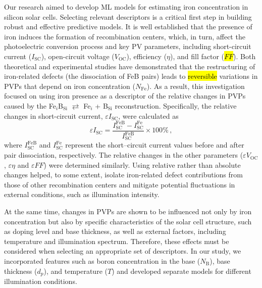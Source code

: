\documentclass[a4paper,fleqn,draft]{cas-sc}
\begin{document}
Our research aimed to develop ML models for estimating iron concentration in silicon solar cells.
Selecting relevant descriptors is a critical first step in building robust and effective predictive models.
It is well established that the presence of iron induces the formation of recombination centers, which, in turn, affect the photoelectric conversion process and key PV parameters,
including short-circuit current ($I_\mathrm{SC}$), open-circuit voltage ($V_\mathrm{OC}$), efficiency ($\eta$), and fill factor
(\textcolor[rgb]{1.00,0.07,0.00}{\hl{$F\!F$}}).
Both theoretical and experimental studies \cite{FeB:Schmidt,IronSC,Olikh2025MSEB} have demonstrated that the restructuring of iron-related defects (the dissociation of FeB pairs)
leads to
\textcolor[rgb]{1.00,0.07,0.00}{
\hl{
reversible
}}
variations in PVPs that depend on iron concentration ($N_\mathrm{Fe}$).
As a result, this investigation focused on using iron presence as a descriptor of the relative changes in PVPs caused by the
Fe$_i$B$_\mathrm{Si}$ $\rightleftarrows$ Fe$_i$ + B$_\mathrm{Si}$ reconstruction.
Specifically, the relative changes in short-circuit current, $\varepsilon I_\mathrm{SC}$, were calculated as
\begin{equation}
\label{eq1}
    \varepsilon I_\mathrm{SC} = \frac{I_\mathrm{SC}^\mathrm{FeB} - I_\mathrm{SC}^\mathrm{Fe}}{I_\mathrm{SC}^\mathrm{FeB}} \times 100 \%\,,
\end{equation}
where $I_\mathrm{SC}^\mathrm{FeB}$ and $I_\mathrm{SC}^\mathrm{Fe}$ represent the short--circuit current values before and after pair dissociation, respectively.
The relative changes in the other parameters ($\varepsilon V_\mathrm{OC}$, $\varepsilon \eta$ and $\varepsilon F\!F$) were determined similarly.
Using relative rather than absolute changes helped, to some extent,
isolate iron-related defect contributions from those of other recombination centers
and mitigate potential fluctuations in external conditions, such as illumination intensity.

At the same time, changes in PVPs are shown \cite{FeB:Schmidt,Olikh2025MSEB} to be influenced not only by iron concentration
but also by specific characteristics of the solar cell structure, such as doping level and base thickness,
as well as external factors, including temperature and illumination spectrum.
Therefore, these effects must be considered when selecting an appropriate set of descriptors.
In our study, we incorporated features such as boron concentration in the base ($N_\mathrm{B}$), base thickness ($d_p$), and temperature ($T$)
and developed separate models for different illumination conditions.
\end{document}
